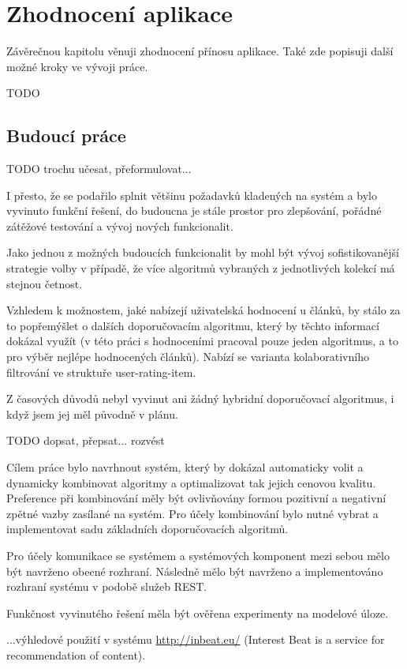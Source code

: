 \documentclass[thesis=M,czech]{FITthesis}[2014/05/07]
\begin{document}
\chapter{Zhodnocení aplikace}
\label{chap:futurework}	
Závěrečnou kapitolu věnuji zhodnocení přínosu aplikace. Také zde popisuji další možné kroky ve vývoji práce.

TODO

\section{Budoucí práce}
TODO trochu učesat, přeformulovat...

I přesto, že se podařilo splnit většinu požadavků kladených na systém a bylo vyvinuto funkční řešení, do budoucna je stále prostor pro zlepšování, pořádné zátěžové testování a vývoj nových funkcionalit.

Jako jednou z možných budoucích funkcionalit by mohl být vývoj sofistikovanější strategie volby v případě, že více algoritmů vybraných z jednotlivých kolekcí má stejnou četnost.

Vzhledem k možnostem, jaké nabízejí uživatelská hodnocení u článků, by stálo za to popřemýšlet o dalších doporučovacím algoritmu, který by těchto informací dokázal využít (v této práci s hodnoceními pracoval pouze jeden algoritmus, a to pro výběr nejlépe hodnocených článků). Nabízí se varianta kolaborativního filtrování ve struktuře user-rating-item.

Z časových důvodů nebyl vyvinut ani žádný hybridní doporučovací algoritmus, i když jsem jej měl původně v plánu.

\begin{conclusion}
TODO dopsat, přepsat... rozvést

Cílem práce bylo navrhnout systém, který by dokázal automaticky volit a dynamicky kombinovat algoritmy a optimalizovat tak jejich cenovou kvalitu. Preference při kombinování měly být ovlivňovány formou pozitivní a negativní zpětné vazby zasílané na systém. Pro účely kombinování bylo nutné vybrat a implementovat sadu základních doporučovacích algoritmů. 

Pro účely komunikace se systémem a systémových komponent mezi sebou mělo být navrženo obecné rozhraní. Následně mělo být navrženo a implementováno rozhraní systému v podobě služeb REST.

Funkčnost vyvinutého řešení měla být ověřena experimenty na modelové úloze.

...výhledové použití v systému \url{http://inbeat.eu/} (Interest Beat is a service for recommendation of content). 
\end{conclusion}
\end{document}
